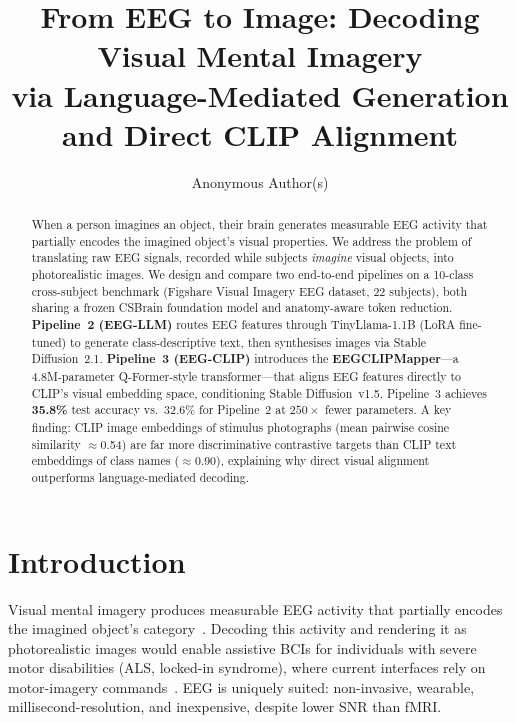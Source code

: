\documentclass{article}
\title{From EEG to Image: Decoding Visual Mental Imagery\\
via Language-Mediated Generation and Direct CLIP Alignment}
\author{Anonymous Author(s)}
\begin{document}
\maketitle

\begin{abstract}
When a person imagines an object, their brain generates measurable EEG activity that partially encodes the imagined object's visual properties. We address the problem of translating raw EEG signals, recorded while subjects \emph{imagine} visual objects, into photorealistic images. We design and compare two end-to-end pipelines on a 10-class cross-subject benchmark (Figshare Visual Imagery EEG dataset, 22 subjects), both sharing a frozen CSBrain foundation model and anatomy-aware token reduction. \textbf{Pipeline~2 (EEG-LLM)} routes EEG features through TinyLlama-1.1B (LoRA fine-tuned) to generate class-descriptive text, then synthesises images via Stable Diffusion~2.1. \textbf{Pipeline~3 (EEG-CLIP)} introduces the \textbf{EEGCLIPMapper}---a 4.8M-parameter Q-Former-style transformer---that aligns EEG features directly to CLIP's visual embedding space, conditioning Stable Diffusion~v1.5. Pipeline~3 achieves \textbf{35.8\%} test accuracy vs.\ 32.6\% for Pipeline~2 at $250\times$ fewer parameters. A key finding: CLIP image embeddings of stimulus photographs (mean pairwise cosine similarity $\approx$0.54) are far more discriminative contrastive targets than CLIP text embeddings of class names ($\approx$0.90), explaining why direct visual alignment outperforms language-mediated decoding.
\end{abstract}

\section{Introduction}

Visual mental imagery produces measurable EEG activity that partially encodes the imagined object's category~\citep{kosslyn2001neural}. Decoding this activity and rendering it as photorealistic images would enable assistive BCIs for individuals with severe motor disabilities (ALS, locked-in syndrome), where current interfaces rely on motor-imagery commands~\citep{birbaumer2000bci}. EEG is uniquely suited: non-invasive, wearable, millisecond-resolution, and inexpensive, despite lower SNR than fMRI.
\end{document}

